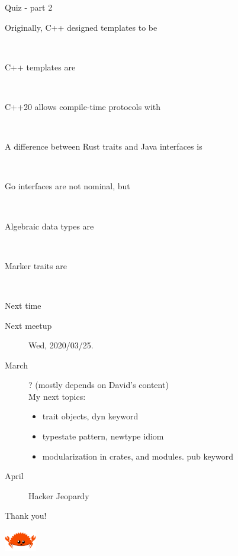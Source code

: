 \documentclass{beamer}
\begin{document}
\begin{frame}[fragile]{Quiz - part 2}
  \begin{description}
    \item[Originally, C++ designed templates to be] ~
    \item[C++ templates are] ~
    \item[C++20 allows compile-time protocols with] ~
    \item[A difference between Rust traits and Java interfaces is] ~
    \item[Go interfaces are not nominal, but] ~
    \item[Algebraic data types are] ~
    \item[Marker traits are] ~
  \end{description}
\end{frame}

%

\begin{frame}[fragile]{Next time}
  \begin{description}
    \item[Next meetup] Wed, 2020/03/25.
    \item[March] ? (mostly depends on David's content) \\
      My next topics:
      \begin{itemize}
        \item trait objects, dyn keyword
        \item typestate pattern, newtype idiom
        \item modularization in crates, and modules. pub keyword
      \end{itemize}
    \item[April] Hacker Jeopardy
  \end{description}
\end{frame}

\begin{frame}[standout]
  Thank you!

  \includegraphics[width=40pt]{images/rustacean-flat-happy.png}
\end{frame}
\end{document}
